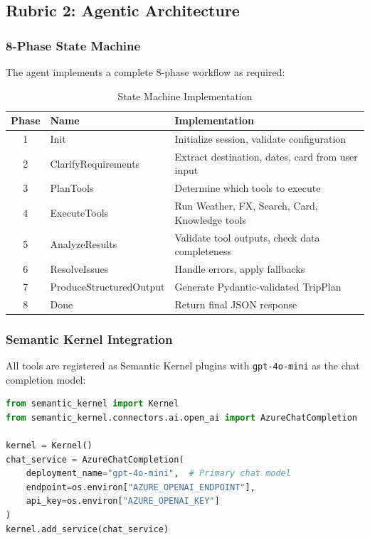 \documentclass[11pt,a4paper]{article}
\begin{document}
\subsection{Rubric 2: Agentic Architecture}

\subsubsection{8-Phase State Machine}
The agent implements a complete 8-phase workflow as required:

\begin{table}[H]
\centering
\caption{State Machine Implementation}
\begin{tabular}{clp{7cm}}
\toprule
\textbf{Phase} & \textbf{Name} & \textbf{Implementation} \\
\midrule
1 & Init & Initialize session, validate configuration \\
2 & ClarifyRequirements & Extract destination, dates, card from user input \\
3 & PlanTools & Determine which tools to execute \\
4 & ExecuteTools & Run Weather, FX, Search, Card, Knowledge tools \\
5 & AnalyzeResults & Validate tool outputs, check data completeness \\
6 & ResolveIssues & Handle errors, apply fallbacks \\
7 & ProduceStructuredOutput & Generate Pydantic-validated TripPlan \\
8 & Done & Return final JSON response \\
\bottomrule
\end{tabular}
\end{table}

\subsubsection{Semantic Kernel Integration}
All tools are registered as Semantic Kernel plugins with \texttt{gpt-4o-mini} as the chat completion model:

\begin{lstlisting}[language=Python]
from semantic_kernel import Kernel
from semantic_kernel.connectors.ai.open_ai import AzureChatCompletion

kernel = Kernel()
chat_service = AzureChatCompletion(
    deployment_name="gpt-4o-mini",  # Primary chat model
    endpoint=os.environ["AZURE_OPENAI_ENDPOINT"],
    api_key=os.environ["AZURE_OPENAI_KEY"]
)
kernel.add_service(chat_service)
\end{lstlisting}
\end{document}
